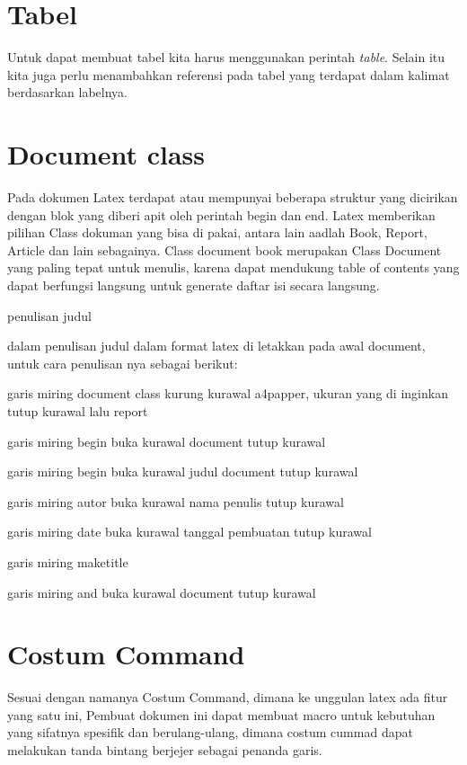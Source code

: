 \section{Tabel}
Untuk dapat membuat tabel kita harus menggunakan perintah \textit{table}. Selain itu kita juga perlu menambahkan referensi pada tabel yang terdapat dalam kalimat berdasarkan labelnya.

\section{Document class}

Pada dokumen Latex terdapat atau mempunyai beberapa struktur yang dicirikan dengan blok yang diberi apit oleh perintah begin dan end. Latex memberikan pilihan Class dokuman yang bisa di pakai, antara lain aadlah Book, Report, Article dan lain sebagainya. Class document book merupakan Class Document yang paling tepat untuk menulis, karena dapat mendukung table of contents yang dapat berfungsi langsung untuk generate daftar isi secara langsung.

penulisan judul

dalam penulisan judul dalam format latex di letakkan pada awal document, untuk cara penulisan nya sebagai berikut:

garis miring document class kurung kurawal a4papper, ukuran yang di inginkan tutup kurawal lalu report

garis miring begin buka kurawal document tutup kurawal

garis miring begin buka kurawal judul document tutup kurawal

garis miring autor buka kurawal nama penulis tutup kurawal

garis miring date buka kurawal tanggal pembuatan tutup kurawal

garis miring maketitle

garis miring and buka kurawal document tutup kurawal

\section{Costum Command}
Sesuai  dengan  namanya Costum Command, dimana ke unggulan latex ada fitur yang satu ini,
Pembuat dokumen ini dapat  membuat macro untuk kebutuhan yang sifatnya spesifik dan berulang-ulang,
dimana costum cummad dapat melakukan tanda bintang berjejer sebagai penanda garis.

